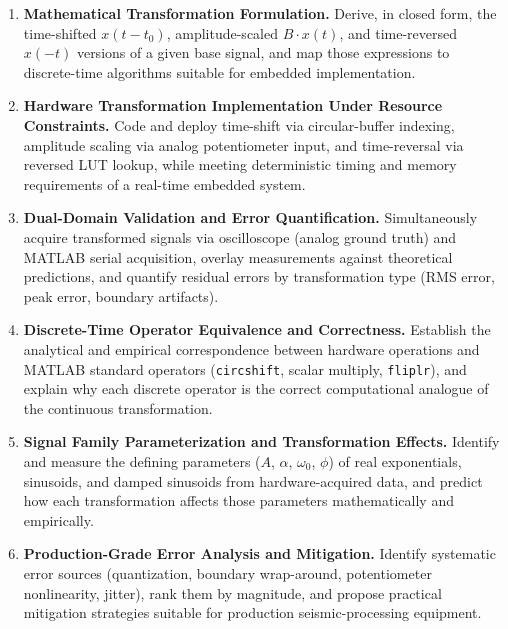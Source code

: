 \documentclass[11pt,letterpaper]{article}
\begin{document}
\begin{enumerate}
    \item \textbf{Mathematical Transformation Formulation.} Derive, in closed form, the time-shifted $x(t-t_0)$, amplitude-scaled $B \cdot x(t)$, and time-reversed $x(-t)$ versions of a given base signal, and map those expressions to discrete-time algorithms suitable for embedded implementation.

    \item \textbf{Hardware Transformation Implementation Under Resource Constraints.} Code and deploy time-shift via circular-buffer indexing, amplitude scaling via analog potentiometer input, and time-reversal via reversed LUT lookup, while meeting deterministic timing and memory requirements of a real-time embedded system.

    \item \textbf{Dual-Domain Validation and Error Quantification.} Simultaneously acquire transformed signals via oscilloscope (analog ground truth) and MATLAB serial acquisition, overlay measurements against theoretical predictions, and quantify residual errors by transformation type (RMS error, peak error, boundary artifacts).

    \item \textbf{Discrete-Time Operator Equivalence and Correctness.} Establish the analytical and empirical correspondence between hardware operations and MATLAB standard operators (\texttt{circshift}, scalar multiply, \texttt{fliplr}), and explain why each discrete operator is the correct computational analogue of the continuous transformation.

    \item \textbf{Signal Family Parameterization and Transformation Effects.} Identify and measure the defining parameters ($A$, $\alpha$, $\omega_0$, $\phi$) of real exponentials, sinusoids, and damped sinusoids from hardware-acquired data, and predict how each transformation affects those parameters mathematically and empirically.

    \item \textbf{Production-Grade Error Analysis and Mitigation.} Identify systematic error sources (quantization, boundary wrap-around, potentiometer nonlinearity, jitter), rank them by magnitude, and propose practical mitigation strategies suitable for production seismic-processing equipment.
\end{enumerate}

\clearpage

\end{document}

